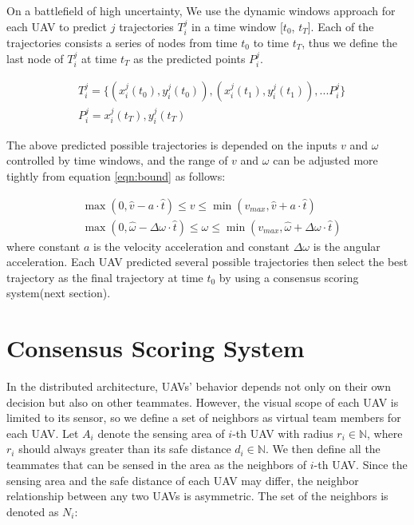 On a battlefield of high uncertainty, We use the dynamic windows approach for each UAV to predict $j$ trajectories $T^{j}_{i}$ in a time window [$t_{0}$, $t_{T}$]. Each of the trajectories consists a series of nodes from time $t_{0}$ to time $t_{T}$, thus we define the last node of $T^{j}_{i}$ at time $t_{T}$ as the predicted points $P^{j}_{i}$.

\begin{equation}
\begin{aligned}
& T^{j}_{i} = \{(x^{j}_{i}(t_{0}), y^{j}_{i}(t_{0})), (x^{j}_{i}(t_{1}), y^{j}_{i}(t_{1})),... P^{j}_{i} \} \\
& P^{j}_{i} = x^{j}_{i}(t_{T}), y^{j}_{i}(t_{T})
\end{aligned}
\end{equation}

The above predicted possible trajectories is depended on the inputs ${v}$ and ${\omega}$ controlled by time windows, and the range of ${v}$ and ${\omega}$ can be adjusted more tightly from equation \ref{eqn:bound} as follows:

\begin{equation}
\begin{aligned}
& \max(0, \hat v-a\cdot \hat{t})\leq v\leq \min(v_{max}, \hat v+a\cdot\hat{t})\\
& \max(0, \hat \omega-\Delta \omega\cdot \hat{t})\leq \omega\leq \min(v_{max}, \hat \omega+\Delta \omega\cdot \hat{t})
\end{aligned}
\end{equation}
where constant $a$ is the velocity acceleration and constant $\Delta\omega$ is the angular acceleration. Each UAV predicted several possible trajectories then select the best trajectory as the final trajectory at time $t_{0}$ by using a consensus scoring system(next section).


\section{Consensus Scoring System}
In the distributed architecture, UAVs' behavior depends not only on their own decision but also on other teammates. However, the visual scope of each UAV is limited to its sensor, so we define a set of neighbors as virtual team members for each UAV. Let $A_{i}$ denote the sensing area of $i$-th UAV with radius $r_{i}\in \mathbb{N}$, where $r_{i}$ should always greater than its safe distance $d_{i}\in \mathbb{N}$. We then define all the teammates that can be sensed in the area as the neighbors of $i$-th UAV. Since the sensing area and the safe distance of each UAV may differ, the neighbor relationship between any two UAVs is asymmetric. The set of the neighbors is denoted as $N_{i}$:

